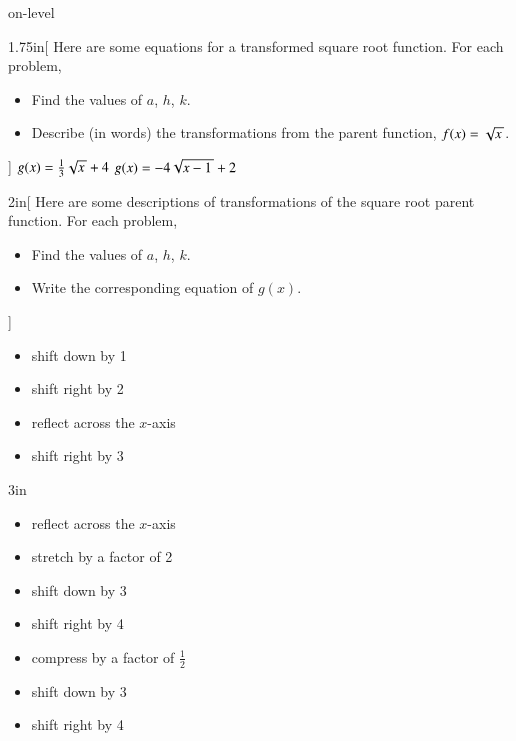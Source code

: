 \begin{taggedblock}{on-level}

\begin{my2Problems}[\normalsize]{1.75in}[%
    Here are some equations for a transformed square root function.
    For each problem,
    \vspace{-1em}
    \begin{itemize}[nosep]
        \item Find the values of $a$, $h$, $k$. 
        \item Describe (in words) the transformations from the parent function, $f(x)=\myRoot{x}$.
    \end{itemize}
    ]
    {
        $g(x) = \frac{1}{3}\myRoot{x} + 4$
    }
    {
        $g(x) = -4\myRoot{x-1}+2$
    }
\end{my2Problems}



\newpage
\begin{my2Problems}[\normalsize]{2in}[%
    Here are some descriptions of transformations of the square root parent function.
    For each problem, 
    \vspace{-1em}
    \begin{itemize}[nosep]
        \item Find the values of $a$, $h$, $k$. 
        \item Write the corresponding equation of $g(x)$.
    \end{itemize}
    ]
    {
        \begin{itemize}[nosep]
            \item shift down by 1
            \item shift right by 2
        \end{itemize}
    }
    {
        \begin{itemize}[nosep]
            \item reflect across the $x$-axis
            \item shift right by 3
        \end{itemize}
    }
\end{my2Problems}
\begin{my2Problems}[\normalsize]{3in}
    {
        \begin{itemize}[nosep]
            \item reflect across the $x$-axis
            \item stretch by a factor of 2
            \item shift down by 3
            \item shift right by 4
        \end{itemize}
    }
    {
        \begin{itemize}[nosep]
            \item compress by a factor of $\frac{1}{2}$
            \item shift down by 3
            \item shift right by 4
        \end{itemize}
    }
\end{my2Problems}


\end{taggedblock}

